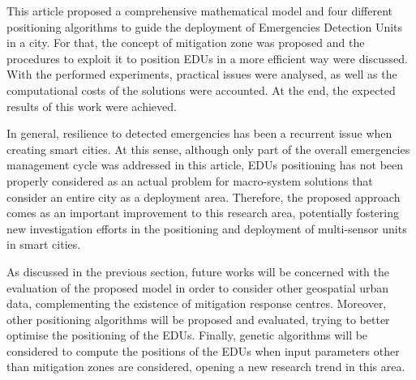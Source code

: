 \begin{refsection}
This article proposed a comprehensive mathematical model and four different positioning algorithms to guide the deployment of Emergencies Detection Units in a city. For that, the concept of mitigation zone was proposed and the procedures to exploit it to position EDUs in a more efficient way were discussed. With the performed experiments, practical issues were analysed, as well as the computational costs of the solutions were accounted. At the end, the expected results of this work were achieved. 

In general, resilience to detected emergencies has been a recurrent issue when creating smart cities. At this sense, although only part of the overall emergencies management cycle was addressed in this article, EDUs positioning has not been properly considered as an actual problem for macro-system solutions that consider an entire city as a deployment area. Therefore, the proposed approach comes as an important improvement to this research area, potentially fostering new investigation efforts in the positioning and deployment of multi-sensor units in smart cities.

As discussed in the previous section, future works will be concerned with the evaluation of the proposed model in order to consider other geospatial urban data, complementing the existence of mitigation response centres. Moreover, other positioning algorithms will be proposed and evaluated, trying to better optimise the positioning of the EDUs. Finally, genetic algorithms will be considered to compute the positions of the EDUs when input parameters other than mitigation zones are considered, opening a new research trend in this area.



% 
% 
% 

\printbibliography[heading=subbibliography]
\end{refsection}
